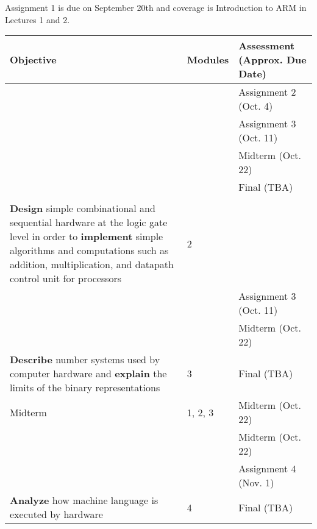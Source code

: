 \begin{frame}[fragile]

Assignment 1 is due on September 20th and coverage is Introduction to ARM in Lectures 1 and 2. 

     \begin{tcolorbox}[enhanced,attach boxed title to top center={yshift=-3mm,yshifttext=-1mm},
  colback=yellow!5!white,colframe=yellow!75!black,colbacktitle=yellow!80!black,
  title=Course Objectives,fonttitle=\bfseries,
  boxed title style={size=small,colframe=yellow!50!black},
  left skip=1mm, right skip=1mm, grow to left by=0cm, grow to right by=0cm]
{
    {\tiny
    \begin{tabular}{p{5cm} | p{1cm} | p{37mm}}
        \textbf{Objective} & \textbf{Modules} & \textbf{Assessment (Approx. Due Date)} \\
    \hline
         &  & Assignment 2 (Oct. 4) \\
         &  & Assignment 3 (Oct. 11) \\
         &  & Midterm (Oct. 22) \\
         &  & Final (TBA) \\
         &  &  \\
        \multirow{-6}{5cm}{\textbf{Design} simple combinational and sequential hardware at the logic gate level in order to \textbf{implement} simple algorithms and computations such as addition, multiplication, and datapath control unit for processors} & \multirow{-6}{2cm}{2} & \\
        \hline

         &  & Assignment 3 (Oct. 11) \\
         &  & Midterm (Oct. 22) \\
        \multirow{-3}{5cm}{\textbf{Describe} number systems used by computer hardware and \textbf{explain} the limits of the binary representations} & \multirow{-3}{2cm}{3} & Final (TBA) \\
        \hline

        Midterm & 1, 2, 3 & Midterm (Oct. 22) \\

        \hline

         &  & Midterm (Oct. 22) \\
         &  & Assignment 4 (Nov. 1) \\
        \multirow{-3}{5cm}{\textbf{Analyze} how machine language is executed by hardware} & \multirow{-3}{2cm}{4} & Final (TBA) \\
        \hline


\end{tabular}}}
\end{tcolorbox}
\end{frame}
